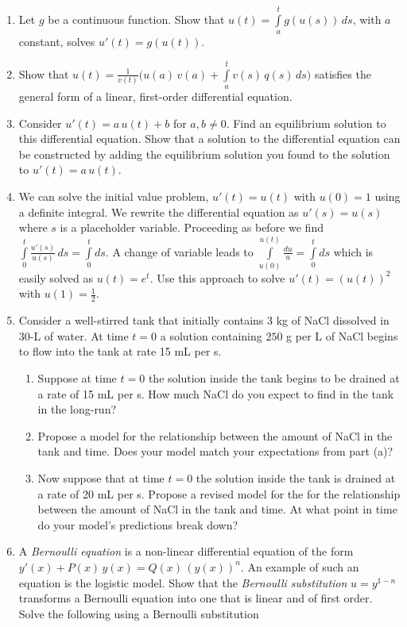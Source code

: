 \documentclass[11pt]{article}
\begin{document}
\begin{enumerate}
\begin{enumerate}
      \item Let $g$ be a continuous function. Show that $u(t) = \int\limits_a^t g( u(s) ) \, ds$, with $a$ constant, solves $u'(t) = g(u(t))$.
      \item Show that $u(t) = \frac{1}{v(t)} \big( u(a)\, v(a) + \int\limits_a^t v(s)\, q(s)\, ds\big)$ satisfies the general form of a linear, first-order differential equation.
      \item Consider $u'(t) = a\, u(t) + b$ for $a,b\neq 0$. Find an equilibrium solution to this differential equation. Show that a solution to the differential equation can be constructed by adding the equilibrium solution you found to the solution to $u'(t) = a\, u(t)$.
      \item We can solve the initial value problem, $u'(t) = u(t)$ with $u(0) = 1$ using a definite integral. We rewrite the differential equation as $u'(s) = u(s)$ where $s$ is a placeholder variable. Proceeding as before we find $\int\limits_0^t \frac{u'(s)}{u(s)}\, ds = \int\limits_0^t ds$. A change of variable leads to $\int\limits_{u(0)}^{u(t)} \frac{du}{u} = \int\limits_0^t ds$ which is easily solved as $u(t) = e^t$. Use this approach to solve $u'(t) = ( u(t) )^2$ with $u(1) = \frac{1}{2}$.
      \item Consider a well-stirred tank that initially contains 3 kg of NaCl dissolved in 30-L of water. At time $t=0$ a solution containing $250$ g per L of NaCl begins to  flow into the tank at rate 15 mL per s. 
        \begin{enumerate}
          \item Suppose at time $t=0$ the solution inside the tank begins to be drained at a rate of 15 mL per s. How much NaCl do you expect to find in the tank in the long-run?
          \item Propose a model for the relationship between the amount of NaCl in the tank and time. Does your model match your expectations from part (a)?
          \item Now suppose that at time $t=0$ the solution inside the tank is drained at a rate of 20 mL per s. Propose a revised model for the   for the relationship between the amount of NaCl in the tank and time. At what point in time do your model's predictions break down? 
        \end{enumerate}
      \item A {\it Bernoulli equation} is a non-linear differential equation of the form $y'(x) + P(x)\, y(x) = Q(x) \, (y(x))^n$. An example of such an equation is the logistic model. Show that the {\it Bernoulli substitution} $u = y^{1-n}$ transforms a Bernoulli equation into one that is linear and of first order. Solve the following using a Bernoulli substitution

\end{enumerate}
\end{enumerate}
\end{document}
